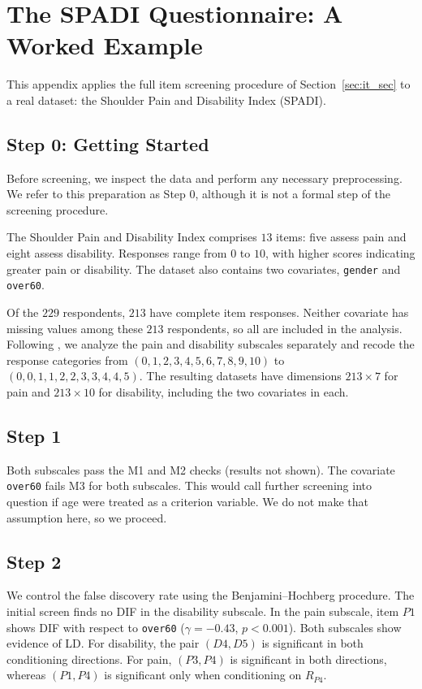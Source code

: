 \section*{The SPADI Questionnaire: A Worked Example}

This appendix applies the full item screening procedure of Section~\ref{sec:it_sec} to a real dataset: the Shoulder Pain and Disability Index (SPADI).

\subsection{Step 0: Getting Started}
Before screening, we inspect the data and perform any necessary preprocessing. We refer to this preparation as Step 0, although it is not a formal step of the screening procedure.


The Shoulder Pain and Disability Index comprises $13$ items: five assess pain and eight assess disability. Responses range from $0$ to $10$, with higher scores indicating greater pain or disability. The dataset also contains two covariates, \texttt{gender} and \texttt{over60}.

Of the $229$ respondents, $213$ have complete item responses. Neither covariate has missing values among these $213$ respondents, so all are included in the analysis. Following \citet{christensen-et-al-2019}, we analyze the pain and disability subscales separately and recode the response categories from $(0,1,2,3,4,5,6,7,8,9,10)$ to $(0,0,1,1,2,2,3,3,4,4,5)$. The resulting datasets have dimensions $213\times 7$ for pain and $213\times 10$ for disability, including the two covariates in each.


\subsection{Step 1}
Both subscales pass the M1 and M2 checks (results not shown). The covariate \texttt{over60} fails M3 for both subscales. This would call further screening into question if age were treated as a criterion variable. We do not make that assumption here, so we proceed.


\subsection{Step 2}
We control the false discovery rate using the Benjamini--Hochberg procedure. The initial screen finds no DIF in the disability subscale. In the pain subscale, item $P1$ shows DIF with respect to \texttt{over60} ($\gamma=-0.43$, $p<0.001$). Both subscales show evidence of LD. For disability, the pair $(D4,D5)$ is significant in both conditioning directions. For pain, $(P3,P4)$ is significant in both directions, whereas $(P1,P4)$ is significant only when conditioning on $R_{P4}$.

